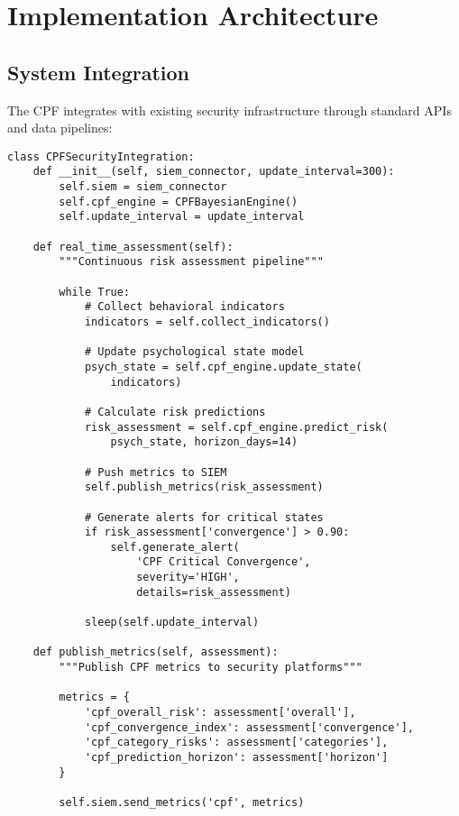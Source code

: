 \documentclass[10pt,twocolumn]{IEEEtran}
\begin{document}
\section{Implementation Architecture}

\subsection{System Integration}

The CPF integrates with existing security infrastructure through standard APIs and data pipelines:

\begin{lstlisting}[caption={SIEM Integration Architecture},label={lst:siem}]
class CPFSecurityIntegration:
    def __init__(self, siem_connector, update_interval=300):
        self.siem = siem_connector
        self.cpf_engine = CPFBayesianEngine()
        self.update_interval = update_interval
        
    def real_time_assessment(self):
        """Continuous risk assessment pipeline"""
        
        while True:
            # Collect behavioral indicators
            indicators = self.collect_indicators()
            
            # Update psychological state model
            psych_state = self.cpf_engine.update_state(
                indicators)
            
            # Calculate risk predictions
            risk_assessment = self.cpf_engine.predict_risk(
                psych_state, horizon_days=14)
            
            # Push metrics to SIEM
            self.publish_metrics(risk_assessment)
            
            # Generate alerts for critical states
            if risk_assessment['convergence'] > 0.90:
                self.generate_alert(
                    'CPF Critical Convergence',
                    severity='HIGH',
                    details=risk_assessment)
            
            sleep(self.update_interval)
            
    def publish_metrics(self, assessment):
        """Publish CPF metrics to security platforms"""
        
        metrics = {
            'cpf_overall_risk': assessment['overall'],
            'cpf_convergence_index': assessment['convergence'],
            'cpf_category_risks': assessment['categories'],
            'cpf_prediction_horizon': assessment['horizon']
        }
        
        self.siem.send_metrics('cpf', metrics)
\end{lstlisting}
\end{document}
